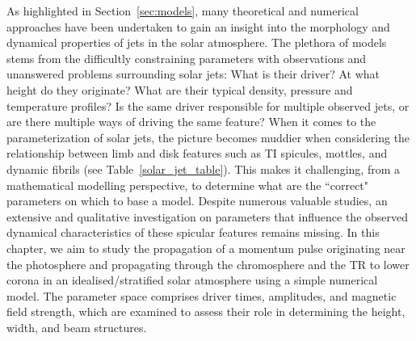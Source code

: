 As highlighted in Section~\ref{sec:models}, many theoretical and numerical approaches have been undertaken to gain an insight into the morphology and dynamical properties of jets in the solar atmosphere. The plethora of models stems from the difficultly constraining parameters with observations and unanswered problems surrounding solar jets: What is their driver? At what height do they originate? What are their typical density, pressure and temperature profiles? Is the same driver responsible for multiple observed jets, or are there multiple ways of driving the same feature? When it comes to the parameterization of solar jets, the picture becomes muddier when considering the relationship between limb and disk features such as TI spicules, mottles, and dynamic fibrils (see Table~\ref{solar_jet_table}). This makes it challenging, from a mathematical modelling perspective, to determine what are the ``correct" parameters on which to base a model. Despite numerous valuable studies, an extensive and qualitative investigation on parameters that influence the observed dynamical characteristics of these spicular features remains missing. In this chapter, we aim to study the propagation of a momentum pulse originating near the photosphere and propagating through the chromosphere and the TR to lower corona in an idealised/stratified solar atmosphere using a simple numerical model. The parameter space comprises driver times, amplitudes, and magnetic field strength, which are examined to assess their role in determining the height, width, and beam structures.
